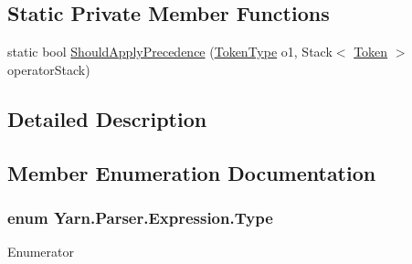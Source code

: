 \subsection*{Static Private Member Functions}
\begin{DoxyCompactItemize}
\item 
static bool \hyperlink{a00054_a5004a8eaa00b2b55856ecb4f339033fb}{Should\-Apply\-Precedence} (\hyperlink{a00040_a301aa7c866593a5b625a8fc158bbeace}{Token\-Type} o1, Stack$<$ \hyperlink{a00093}{Token} $>$ operator\-Stack)
\end{DoxyCompactItemize}


\subsection{Detailed Description}


\subsection{Member Enumeration Documentation}
\hypertarget{a00054_aceddb5496ccffe668bced2d131e4bf86}{
\subsubsection[{Type}]{\setlength{\rightskip}{0pt plus 5cm}enum {\bf Yarn.\-Parser.\-Expression.\-Type}\hspace{0.3cm}{\ttfamily [package]}}}\label{a00054_aceddb5496ccffe668bced2d131e4bf86}
\begin{Desc}
\item[Enumerator]\par
\begin{description}
\item[{\em 
\hypertarget{a00054_aceddb5496ccffe668bced2d131e4bf86a689202409e48743b914713f96d93947c}{Value}\label{a00054_aceddb5496ccffe668bced2d131e4bf86a689202409e48743b914713f96d93947c}
}]\item[{\em 
\hypertarget{a00054_aceddb5496ccffe668bced2d131e4bf86affb017548928ab2305e7c55cb67c04ca}{Function\-Call}\label{a00054_aceddb5496ccffe668bced2d131e4bf86affb017548928ab2305e7c55cb67c04ca}
}]\end{description}
\end{Desc}

